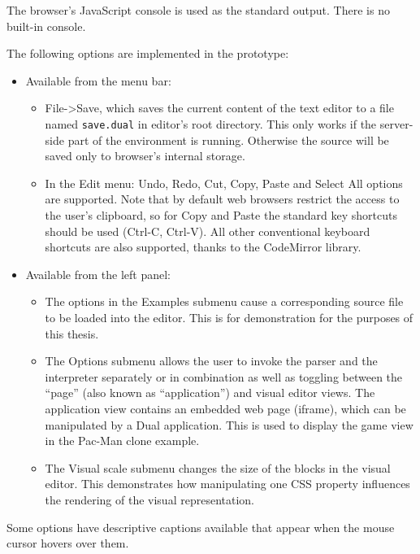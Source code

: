 The browser's JavaScript console is used as the standard output. There is no built-in console.

The following options are implemented in the prototype:
\begin{itemize}
    \item Available from the menu bar:
    \begin{itemize}
        \item File->Save, which saves the current content of the text editor to
          a file named \texttt{save.dual} in editor's root directory. This only
          works if the server-side part of the environment is running. Otherwise
          the source will be saved only to browser's internal storage.
        \item In the Edit menu: Undo, Redo, Cut, Copy, Paste and Select All
          options are supported. Note that by default web browsers restrict the
          access to the user's clipboard, so for Copy and Paste the standard key
          shortcuts should be used (Ctrl-C, Ctrl-V). All other conventional
          keyboard shortcuts are also supported, thanks to the CodeMirror
          library.
    \end{itemize}
    \item Available from the left panel:
    \begin{itemize}
        \item The options in the Examples submenu cause a corresponding source
          file to be loaded into the editor. This is for demonstration for the
          purposes of this thesis.
        \item The Options submenu allows the user to invoke the parser and the
          interpreter separately or in combination as well as toggling between
          the ``page'' (also known as ``application'') and visual editor
          views. The application view contains an embedded web page (iframe),
          which can be manipulated by a Dual application. This is used to
          display the game view in the Pac-Man clone example.
        \item The Visual scale submenu changes the size of the blocks in the
          visual editor. This demonstrates how manipulating one CSS property
          influences the rendering of the visual representation.
    \end{itemize}
\end{itemize}

Some options have descriptive captions available that appear when the mouse
cursor hovers over them.


